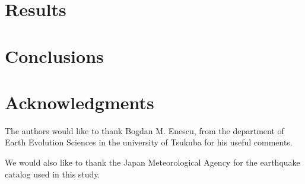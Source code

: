 \section{Results}\label{Results}

\section{Conclusions}\label{Conclusions}

\section*{Acknowledgments}
The authors would like to thank Bogdan M. Enescu, from the department
of Earth Evolution Sciences in the university of Tsukuba for his
useful comments. 

We would also like to thank the Japan Meteorological Agency for the
earthquake catalog used in this study.
